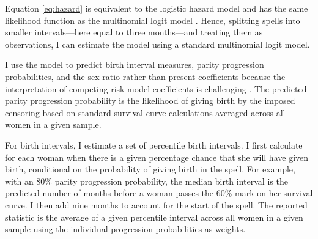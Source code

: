 \documentclass[12pt,letterpaper]{article}
\begin{document}


Equation \ref{eq:hazard} is equivalent to the logistic hazard model and has the same 
likelihood function as the multinomial logit model \citep{allison82,jenkins95}.
Hence, splitting spells into smaller intervals---here equal to three months---and 
treating them as observations, I can estimate the model using a standard multinomial 
logit model. 

I use the model to predict birth interval measures, parity progression probabilities, 
and the sex ratio rather than present coefficients because the interpretation 
of competing risk model coefficients is challenging \citep{thomas96}.
The predicted parity progression probability is the likelihood of giving birth by the
imposed censoring based on standard survival curve calculations averaged across all
women in a given sample.

For birth intervals, I estimate a set of percentile birth intervals. 
I first calculate for each woman when there is a given percentage chance that she will have 
given birth, conditional on the probability of giving birth in the spell. 
For example, with an 80\% parity progression probability, the median birth interval 
is the predicted number of months before a woman passes the 60\% mark on her survival 
curve. 
I then add nine months to account for the start of the spell. 
The reported statistic is the average of a given percentile interval across all women in 
a given sample using the individual progression probabilities as weights.

\end{document}
